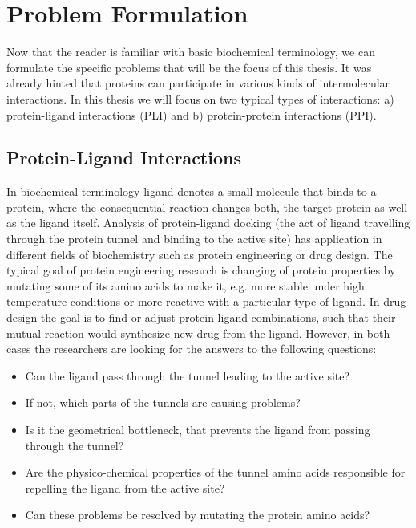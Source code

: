 \section{Problem Formulation}
Now that the reader is familiar with basic biochemical terminology, we can formulate the specific problems that will be the focus of this thesis. It was already hinted that proteins can participate in various kinds of intermolecular interactions. In this thesis we will focus on two typical types of interactions: a) protein-ligand interactions (PLI) and b) protein-protein interactions (PPI).

\subsection{Protein-Ligand Interactions} 
In biochemical terminology ligand denotes a small molecule that binds to a protein, where the consequential reaction changes both, the target protein as well as the ligand itself. Analysis of protein-ligand docking (the act of ligand travelling through the protein tunnel and binding to the active site) has application in different fields of biochemistry such as protein engineering or drug design. The typical goal of protein engineering research is changing of protein properties by mutating some of its amino acids to make it, e.g. more stable under high temperature conditions or more reactive with a particular type of ligand. In drug design the goal is to find or adjust protein-ligand combinations, such that their mutual reaction would synthesize new drug from the ligand.
However, in both cases the researchers are looking for the answers to the following questions:
\begin{itemize}
\setlength\itemsep{0.5pt}
\item{Can the ligand pass through the tunnel leading to the active site?}
\item{If not, which parts of the tunnels are causing problems?}
\item{Is it the geometrical bottleneck, that prevents the ligand from passing through the tunnel?}
\item{Are the physico-chemical properties of the tunnel amino acids responsible for repelling the ligand from the active site?}
\item{Can these problems be resolved by mutating the protein amino acids?}
\end{itemize}

